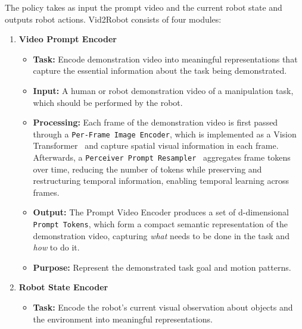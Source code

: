 The policy takes as input the prompt video and the current robot state and outputs robot actions. Vid2Robot consists of four
modules: 
\begin{enumerate}
    \item \textbf{Video Prompt Encoder}
        \begin{itemize}
            \item \textbf{Task:} 
            Encode demonstration video into meaningful representations that capture the essential information about the task being demonstrated.
            \item \textbf{Input:} A human or robot demonstration video of a manipulation task, which should be performed by the robot. 
            \item \textbf{Processing:} 
            Each frame of the demonstration video is first passed through a \texttt{Per-Frame Image Encoder}, which is implemented as a Vision Transformer~\cite{Dosovitskiy2020AnII} and capture spatial visual information in each frame. Afterwards, a \texttt{Perceiver Prompt Resampler}~\cite{Bousmalis2023RoboCatAS, Jaegle2021PerceiverIA} aggregates frame tokens over time, reducing the number of tokens while preserving and restructuring temporal information, enabling temporal learning across frames. 
            \item \textbf{Output:} 
            The Prompt Video Encoder produces a set of d-dimensional \texttt{Prompt Tokens}, which form a compact semantic representation of the demonstration video, capturing \textit{what} needs to be done in the task and \textit{how} to do it. 
            \item \textbf{Purpose:} 
            Represent the demonstrated task goal and motion patterns.
        \end{itemize}
    \item \textbf{Robot State Encoder}
        \begin{itemize}
            \item \textbf{Task:} 
            Encode the robot's current visual observation about objects and the environment into meaningful representations.

\end{itemize}
\end{enumerate}
